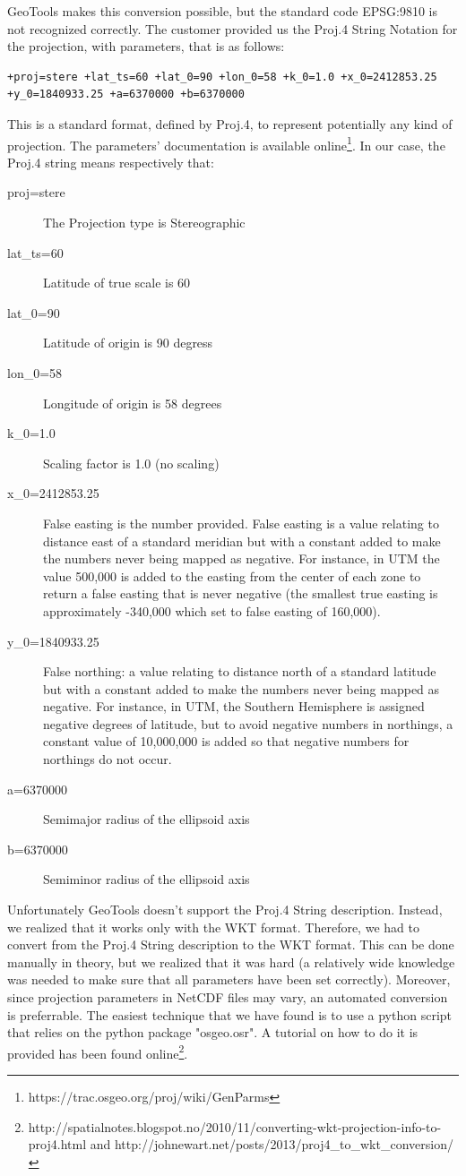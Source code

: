 \documentclass[11pt,a4paper,titlepage,oneside]{report}
\begin{document}
GeoTools makes this conversion possible, but the standard code EPSG:9810 is not recognized correctly. 
The customer provided us the Proj.4 String Notation for the projection, with parameters, that is as follows:
\begin{lstlisting}
+proj=stere +lat_ts=60 +lat_0=90 +lon_0=58 +k_0=1.0 +x_0=2412853.25 +y_0=1840933.25 +a=6370000 +b=6370000
\end{lstlisting}
This is a standard format, defined by Proj.4, to represent potentially any kind of projection. The parameters' documentation is available online\footnote{https://trac.osgeo.org/proj/wiki/GenParms}. In our case, the Proj.4 string means respectively that:
\begin{description}
\item[proj=stere] The Projection type is Stereographic
\item[lat\_ts=60] Latitude of true scale is 60
\item[lat\_0=90] Latitude of origin is 90 degress
\item[lon\_0=58] Longitude of origin is 58 degrees
\item[k\_0=1.0] Scaling factor is 1.0 (no scaling)
\item[x\_0=2412853.25] False easting is the number provided. False easting is a value relating to distance east of a standard meridian but with a constant added to make the numbers never being mapped as negative. For instance, in UTM the value 500,000 is added to the easting from the center of each zone to return a false easting that is never negative (the smallest true easting is approximately -340,000 which set to false easting of 160,000).
\item[y\_0=1840933.25] False northing: a value relating to distance north of a standard latitude but with a constant added to make the numbers never being mapped as negative. For instance, in UTM, the Southern Hemisphere is assigned negative degrees of latitude, but to avoid negative numbers in northings, a constant value of 10,000,000 is added so that negative numbers for northings do not occur.
\item[a=6370000] Semimajor radius of the ellipsoid axis
\item[b=6370000] Semiminor radius of the ellipsoid axis
\end{description}

Unfortunately GeoTools doesn't support the Proj.4 String description. Instead, we realized that it works only with the \gls{WKT} format.
Therefore, we had to convert from the Proj.4 String description to the WKT format.
This can be done manually in theory, but we realized that it was hard (a relatively wide knowledge was needed to make sure that all parameters have been set correctly). Moreover, since projection parameters in NetCDF files may vary, an automated conversion is preferrable.
The easiest technique that we have found is to use a python script that relies on the python package "osgeo.osr". A tutorial on how to do it is provided has been found online\footnote{http://spatialnotes.blogspot.no/2010/11/converting-wkt-projection-info-to-proj4.html and http://johnewart.net/posts/2013/proj4\_to\_wkt\_conversion/}.
\end{document}
